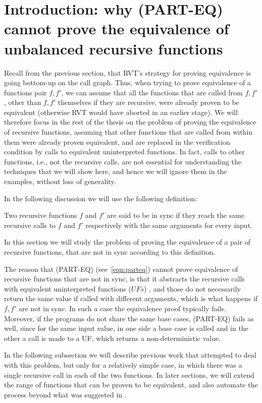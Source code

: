 \section{Introduction: why (PART-EQ) cannot prove the equivalence of unbalanced recursive functions}
Recall from the previous section, that RVT's strategy for proving equivalence is going bottom-up on the call graph. Thus, when trying to prove equivalence of a functions pair $f,f'$, we can assume that all the functions that are called from $f,f'$, other than $f,f'$ themselves if they are recursive, were already proven to be equivalent (otherwise RVT would have aborted in an earlier stage). We will therefore focus in the rest of the thesis on the problem of proving the equivalence of recursive functions, assuming that other functions that are called from within them were already proven equivalent, and are replaced in the verification condition by calls to equivalent uninterpreted functions. In fact, calls to other functions, i.e., not the recursive calls, are not essential for understanding the techniques that we will show here, and hence we will ignore them in the examples, without loss of generality. 

In the following discussion we will use the following definition:
\begin{definition}[Sync]
Two recursive functions $f$ and $f'$ are said to be in sync if they reach the same recursive calls to $f$ and $f'$ respectively with the same arguments for every input.
\end{definition}
In this section we will study the problem of proving the equivalence of a pair of recursive functions, that are not in sync according to this definition. 


The reason that (PART-EQ) (see~\ref{eqn:parteq}) cannot prove equivalence of recursive functions that are not in sync, is that it abstracts the recursive calls with equivalent uninterpreted functions ($UFs$) \cite{DBLP:conf/dac/GodlinS09}, and those do not necessarily return the same value if called with different arguments, which is what happens if $f,f'$ are not in sync. In such a case the equivalence proof typically fails.
Moreover, if the programs do not share the same base cases, (PART-EQ) fails as well, since for the same input value, in one side a base case is called and in the other a call is made to a UF, which returns a non-deterministic value.

In the following subsection we will describe previous work\cite{DBLP:conf/fm/StrichmanV16} that attempted to deal with this problem, but only for a relatively simple case, in which there was a single recursive call in each of the two functions. In later sections, we will extend the range of functions that can be proven to be equivalent, and also automate the process beyond what was suggested in \cite{DBLP:conf/fm/StrichmanV16}.

